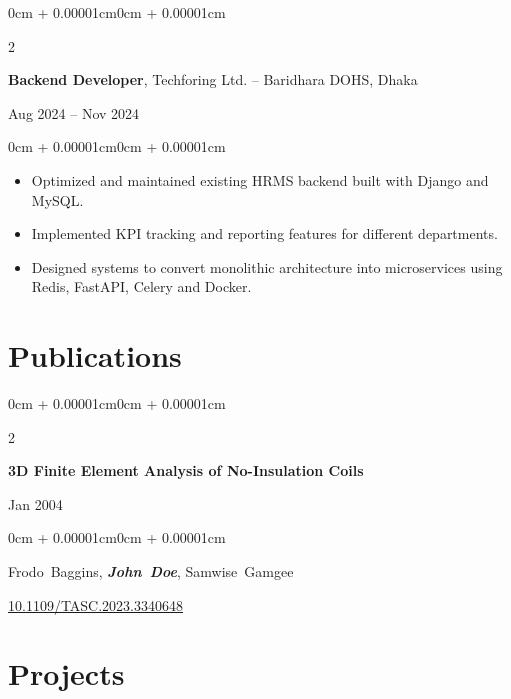 \documentclass[10pt, letterpaper]{article}
\newenvironment{highlights}{
  \begin{itemize}[
    topsep=0.10cm,
    parsep=0.10cm,
    partopsep=0pt,
    itemsep=0pt,
    leftmargin=0cm + 10pt
  ]
}{
  \end{itemize}
}
\newenvironment{onecolentry}{
  \begin{adjustwidth}{0cm + 0.00001cm}{0cm + 0.00001cm}
}{
  \end{adjustwidth}
}
\newenvironment{twocolentry}[2][]{
  \onecolentry
  \def\secondColumn{#2}
  \setcolumnwidth{\fill, 4.5cm}
  \begin{paracol}{2}
}{
  \switchcolumn \raggedleft \secondColumn
  \end{paracol}
  \endonecolentry
}
\begin{document}
\begin{twocolentry}{Aug 2024 -- Nov 2024}
    \textbf{Backend Developer}, Techforing Ltd. -- Baridhara DOHS, Dhaka
\end{twocolentry}

\vspace{0.10cm}

\begin{onecolentry}
    \begin{highlights}
        \item Optimized and maintained existing HRMS backend built with Django and MySQL.
        \item Implemented KPI tracking and reporting features for different departments.
        \item Designed systems to convert monolithic architecture into microservices using Redis, FastAPI, Celery and Docker.
    \end{highlights}
\end{onecolentry}

\section{Publications}

\begin{samepage}
    \begin{twocolentry}{Jan 2004}
        \textbf{3D Finite Element Analysis of No-Insulation Coils}
    \end{twocolentry}

    \vspace{0.10cm}

    \begin{onecolentry}
        \mbox{Frodo Baggins}, \mbox{\textbf{\textit{John Doe}}}, \mbox{Samwise Gamgee}

        \vspace{0.10cm}

        \href{https://doi.org/10.1109/TASC.2023.3340648}{10.1109/TASC.2023.3340648}
    \end{onecolentry}
\end{samepage}

\section{Projects}
\end{document}

